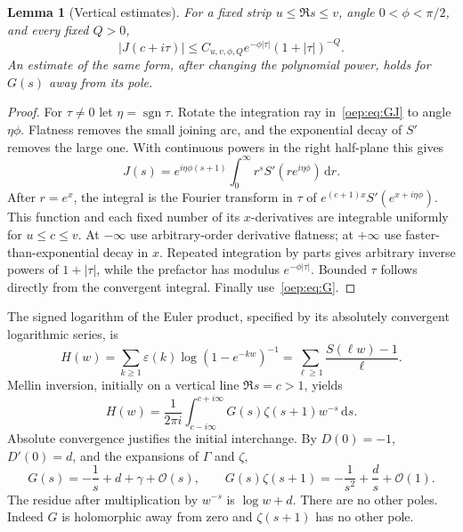 \documentclass[11pt,letterpaper]{article}
\newtheorem{lemma}[theorem]{Lemma}
\theoremstyle{remark}\newtheorem{remark}[theorem]{Remark}
\newcommand{\eps}{\varepsilon}
\newcommand{\dd}{\,\mathrm d}
\newcommand{\OO}{\mathcal O}
\begin{document}
\begin{lemma}[Vertical estimates]\label{oep:lem:vertical}
For a fixed strip $u\leq\Re s\leq v$, angle $0<\phi<\pi/2$, and every fixed $Q>0$,
\begin{equation}\label{oep:eq:vertical}
 |J(c+i\tau)|\leq C_{u,v,\phi,Q}e^{-\phi|\tau|}(1+|\tau|)^{-Q}.
\end{equation}
An estimate of the same form, after changing the polynomial power, holds for $G(s)$ away from its pole.
\end{lemma}
\begin{proof}
For $\tau\ne0$ let $\eta=\operatorname{sgn}\tau$. Rotate the integration ray in~\eqref{oep:eq:GJ} to angle $\eta\phi$. Flatness removes the small joining arc, and the exponential decay of $S'$ removes the large one. With continuous powers in the right half-plane this gives
\[
 J(s)=e^{i\eta\phi(s+1)}\int_0^\infty r^sS'(re^{i\eta\phi})\dd r.
\]
After $r=e^x$, the integral is the Fourier transform in $\tau$ of
$e^{(c+1)x}S'(e^{x+i\eta\phi})$. This function and each fixed number of its $x$-derivatives are integrable uniformly for $u\leq c\leq v$. At $-\infty$ use arbitrary-order derivative flatness; at $+\infty$ use faster-than-exponential decay in $x$. Repeated integration by parts gives arbitrary inverse powers of $1+|\tau|$, while the prefactor has modulus $e^{-\phi|\tau|}$. Bounded $\tau$ follows directly from the convergent integral. Finally use~\eqref{oep:eq:G}.
\end{proof}

The signed logarithm of the Euler product, specified by its absolutely convergent logarithmic series, is
\begin{equation}\label{oep:eq:H}
 H(w)=\sum_{k\geq1}\eps(k)\log(1-e^{-kw})^{-1}
     =\sum_{\ell\geq1}\frac{S(\ell w)-1}{\ell}.
\end{equation}
Mellin inversion, initially on a vertical line $\Re s=c>1$, yields
\begin{equation}\label{oep:eq:Hinversion}
 H(w)=\frac1{2\pi i}\int_{c-i\infty}^{c+i\infty}
            G(s)\zeta(s+1)w^{-s}\dd s.
\end{equation}
Absolute convergence justifies the initial interchange. By $D(0)=-1$, $D'(0)=d$, and the expansions of $\Gamma$ and $\zeta$,
\[
 G(s)=-\frac1s+d+\gamma+\OO(s),\qquad
 G(s)\zeta(s+1)=-\frac1{s^2}+\frac d s+\OO(1).
\]
The residue after multiplication by $w^{-s}$ is $\log w+d$. There are no other poles. Indeed $G$ is holomorphic away from zero and $\zeta(s+1)$ has no other pole.
\end{document}
